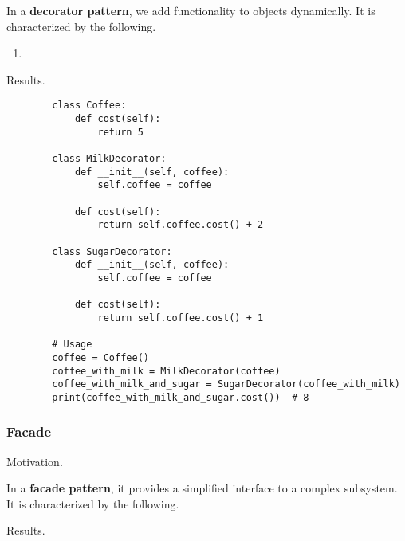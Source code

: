     \begin{definition}[Decorator]
      In a \textbf{decorator pattern}, we add functionality to objects dynamically. It is characterized by the following. 
      \begin{enumerate}
        \item 
      \end{enumerate}
    \end{definition}

    Results. 

    \begin{example}[Coffee]
      \begin{lstlisting}
        class Coffee:
            def cost(self):
                return 5

        class MilkDecorator:
            def __init__(self, coffee):
                self.coffee = coffee
            
            def cost(self):
                return self.coffee.cost() + 2

        class SugarDecorator:
            def __init__(self, coffee):
                self.coffee = coffee
            
            def cost(self):
                return self.coffee.cost() + 1

        # Usage
        coffee = Coffee()
        coffee_with_milk = MilkDecorator(coffee)
        coffee_with_milk_and_sugar = SugarDecorator(coffee_with_milk)
        print(coffee_with_milk_and_sugar.cost())  # 8 
      \end{lstlisting}
    \end{example}

  \subsubsection{Facade}

    Motivation. 

    \begin{definition}
      In a \textbf{facade pattern}, it provides a simplified interface to a complex subsystem. It is characterized by the following. 
    \end{definition}

    Results. 

